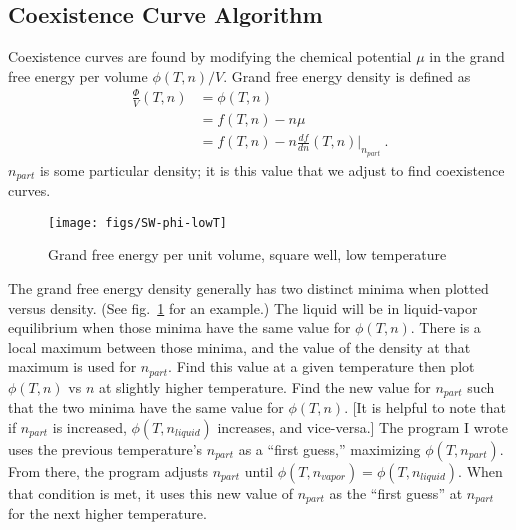 \documentclass[letterpaper,twocolumn,amsmath,amssymb,prb]{revtex4-1}
\newcommand{\npart}{\ensuremath{n_{part}}}
\newcommand{\nliq}{\ensuremath{n_{liquid}}}
\newcommand{\nvap}{\ensuremath{n_{vapor}}}
\newcommand{\1}{\ensuremath{\textbf{r}_1}}
\newcommand{\2}{\ensuremath{\textbf{r}_2}}
\newcommand{\3}{\ensuremath{\textbf{r}_3}}
\newcommand{\4}{\ensuremath{\textbf{r}_4}}
\begin{document}
\subsection{Coexistence Curve Algorithm}\label{subsec:coexis}
Coexistence curves are found by modifying the chemical potential $\mu$
in the grand free energy per volume $\phi(T,n)/V$. Grand free energy
density is defined as
\begin{align}
  \frac{\Phi}{V}(T,n) &= \phi(T,n) \nonumber \\
                 &= f(T,n) - n\mu \nonumber \\
                 &= f(T,n) - n\frac{df}{dn}(T,n)\bigg|_{\npart}\ .
\end{align}
$\npart$ is some particular density; it is this value that we adjust to find coexistence curves.

\begin{figure}
  \centering
  \texttt{[image: figs/SW-phi-lowT]}
  \caption{Grand free energy per unit volume, square well, low temperature}
  \label{fig:SW-phi-lowT}
\end{figure}

The grand free energy density generally has two distinct minima when
plotted versus density. (See fig.~\ref{fig:SW-phi-lowT} for an
example.) The liquid will be in liquid-vapor equilibrium when those
minima have the same value for $\phi(T,n)$. There is a local maximum
between those minima, and the value of the density at that maximum is
used for $\npart$. Find this value at a given temperature then plot
$\phi(T,n)$ vs $n$ at slightly higher temperature. Find the new value
for $\npart$ such that the two minima have the same value for
$\phi(T,n)$. [It is helpful to note that if $\npart$ is increased,
$\phi(T,\nliq)$ increases, and vice-versa.] The program I wrote uses the previous temperature's
$\npart$ as a ``first guess,'' maximizing $\phi(T,\npart)$. From
there, the program adjusts $\npart$ until $\phi(T,\nvap) =
\phi(T,\nliq)$. When that condition is met, it uses this new value of
$\npart$ as the ``first guess'' at $\npart$ for the next higher
temperature.
\end{document}
